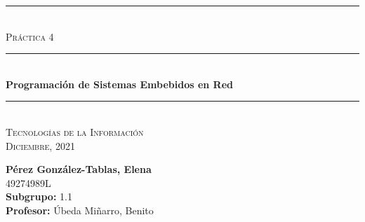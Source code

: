 \begin{titlepage}
	\begin{center}
		\rule{15cm}{0pt} \\
		[3cm]
		\textsc{\Large Práctica 4} \\
		\rule{15cm}{1pt} \\
		[0.25cm]
		\huge{\bfseries Programación de Sistemas Embebidos en Red} \\
		\rule{15cm}{1pt} \\
		\textsc{\Large Tecnologías de la Información} \\
		[0.25cm]
		\textsc{\Large Diciembre, 2021}\\
		[9cm]
	\end{center}
	\begin{flushright}
		\textbf{Pérez González-Tablas, Elena} \\
		[0.25cm]
		49274989L \\
		[0.25cm]
		\textbf{Subgrupo:} 1.1 \\
		[0.25cm]
		\textbf{Profesor:} Úbeda Miñarro, Benito\\
	\end{flushright}
\end{titlepage}
\newpage
\begin{titlepage}
	\begin{flushleft}
	\end{flushleft}
\end{titlepage}